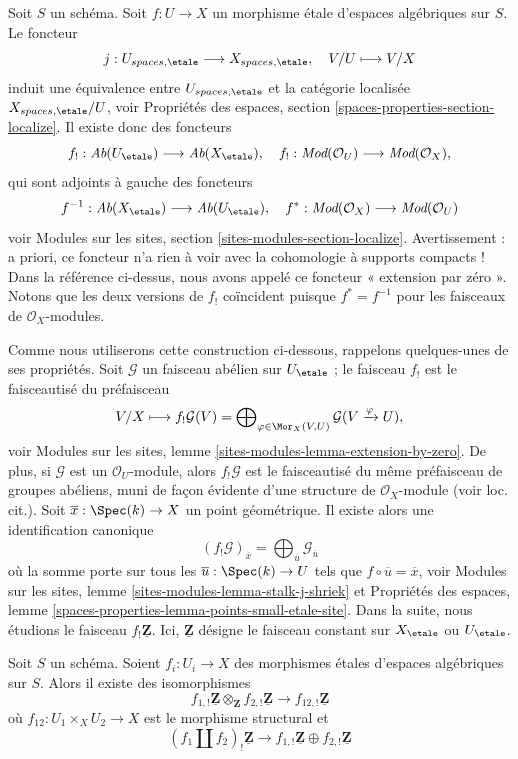 \noindent
Soit $S$ un schéma. Soit $f : U \to X$ un morphisme étale d'espaces
algébriques sur $S$. Le foncteur
$$
j : U_{spaces, \etale} \longrightarrow X_{spaces, \etale},\quad
V/U \longmapsto V/X
$$
induit une équivalence entre $U_{spaces, \etale}$ et la catégorie localisée
$X_{spaces, \etale}/U$, voir
Propriétés des espaces, section \ref{spaces-properties-section-localize}.
Il existe donc des foncteurs
$$
f_! : \textit{Ab}(U_\etale) \longrightarrow
\textit{Ab}(X_\etale),\quad
f_! : \textit{Mod}(\mathcal{O}_U) \longrightarrow \textit{Mod}(\mathcal{O}_X),
$$
qui sont adjoints à gauche des foncteurs
$$
f^{-1} : \textit{Ab}(X_\etale) \longrightarrow
\textit{Ab}(U_\etale),\quad
f^* : \textit{Mod}(\mathcal{O}_X) \longrightarrow \textit{Mod}(\mathcal{O}_U)
$$
voir
Modules sur les sites, section \ref{sites-modules-section-localize}.
Avertissement : a priori, ce foncteur n'a
rien à voir avec la cohomologie à supports compacts !
Dans la référence ci-dessus, nous avons appelé ce foncteur « extension par zéro ».
Notons que les deux versions de $f_!$ coïncident puisque $f^* = f^{-1}$ pour
les faisceaux de $\mathcal{O}_X$-modules.

\medskip\noindent
Comme nous utiliserons cette construction ci-dessous, rappelons quelques-unes de ses
propriétés. Soit $\mathcal{G}$ un faisceau abélien sur $U_\etale$ ;
le faisceau $f_!$ est le faisceautisé du préfaisceau
$$
V/X \longmapsto
f_!\mathcal{G}(V) =
\bigoplus\nolimits_{\varphi \in \Mor_X(V, U)}
\mathcal{G}(V \xrightarrow{\varphi} U),
$$
voir
Modules sur les sites, lemme \ref{sites-modules-lemma-extension-by-zero}.
De plus, si $\mathcal{G}$ est un $\mathcal{O}_U$-module, alors $f_!\mathcal{G}$
est le faisceautisé du même préfaisceau de groupes abéliens,
muni de façon évidente d'une structure de $\mathcal{O}_X$-module
(voir loc. cit.). Soit $\overline{x} : \Spec(k) \to X$
un point géométrique. Il existe alors une identification canonique
$$
(f_!\mathcal{G})_{\overline{x}} =
\bigoplus\nolimits_{\overline{u}} \mathcal{G}_{\overline{u}}
$$
où la somme porte sur tous les $\overline{u} : \Spec(k) \to U$ tels que
$f \circ \overline{u} = \overline{x}$, voir
Modules sur les sites, lemme \ref{sites-modules-lemma-stalk-j-shriek}
et
Propriétés des espaces, lemme
\ref{spaces-properties-lemma-points-small-etale-site}.
Dans la suite, nous étudions le faisceau $f_!\underline{\mathbf{Z}}$.
Ici, $\underline{\mathbf{Z}}$ désigne le faisceau constant sur
$X_\etale$ ou $U_\etale$.

\begin{lemma}
\label{lemma-product-is-tensor-product}
Soit $S$ un schéma. Soient $f_i : U_i \to X$ des morphismes étales
d'espaces algébriques sur $S$. Alors il existe des isomorphismes
$$
f_{1, !}\underline{\mathbf{Z}} \otimes_{\mathbf{Z}}
f_{2, !}\underline{\mathbf{Z}}
\longrightarrow
f_{12, !}\underline{\mathbf{Z}}
$$
où $f_{12} : U_1 \times_X U_2 \to X$ est le morphisme structural
et
$$
(f_1 \amalg f_2)_! \underline{\mathbf{Z}}
\longrightarrow
f_{1, !}\underline{\mathbf{Z}} \oplus
f_{2, !}\underline{\mathbf{Z}}
$$
\end{lemma}

